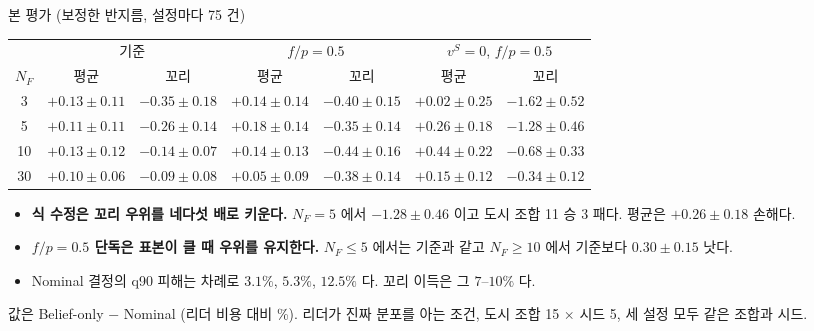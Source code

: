 \documentclass[aspectratio=169,11pt]{beamer}
\begin{document}
\begin{frame}{본 평가 (보정한 반지름, 설정마다 75 건)}
\begin{center}
\footnotesize
\begin{tabular}{ccccccc}
\toprule
 & \multicolumn{2}{c}{기준} & \multicolumn{2}{c}{$f/p = 0.5$} & \multicolumn{2}{c}{$v^{S} = 0$, $f/p = 0.5$}\\
\cmidrule(lr){2-3}\cmidrule(lr){4-5}\cmidrule(lr){6-7}
$N_F$ & 평균 & 꼬리 & 평균 & 꼬리 & 평균 & 꼬리\\
\midrule
3 & $+0.13 \pm 0.11$ & $-0.35 \pm 0.18$ & $+0.14 \pm 0.14$ & $-0.40 \pm 0.15$ & $+0.02 \pm 0.25$ & $-1.62 \pm 0.52$\\
5 & $+0.11 \pm 0.11$ & $-0.26 \pm 0.14$ & $+0.18 \pm 0.14$ & $-0.35 \pm 0.14$ & $+0.26 \pm 0.18$ & $-1.28 \pm 0.46$\\
10 & $+0.13 \pm 0.12$ & $-0.14 \pm 0.07$ & $+0.14 \pm 0.13$ & $-0.44 \pm 0.16$ & $+0.44 \pm 0.22$ & $-0.68 \pm 0.33$\\
30 & $+0.10 \pm 0.06$ & $-0.09 \pm 0.08$ & $+0.05 \pm 0.09$ & $-0.38 \pm 0.14$ & $+0.15 \pm 0.12$ & $-0.34 \pm 0.12$\\
\bottomrule
\end{tabular}
\end{center}
\begin{itemize}
  \item \textbf{식 수정은 꼬리 우위를 네다섯 배로 키운다.} $N_F = 5$ 에서 $-1.28 \pm 0.46$ 이고 도시 조합 11 승 3 패다. 평균은 $+0.26 \pm 0.18$ 손해다.
  \item \textbf{$f/p = 0.5$ 단독은 표본이 클 때 우위를 유지한다.} $N_F \le 5$ 에서는 기준과 같고 $N_F \ge 10$ 에서 기준보다 $0.30 \pm 0.15$ 낫다.
  \item Nominal 결정의 q90 피해는 차례로 $3.1\%$, $5.3\%$, $12.5\%$ 다. 꼬리 이득은 그 $7$--$10\%$ 다.
\end{itemize}
{\footnotesize 값은 Belief-only $-$ Nominal (리더 비용 대비 \%). 리더가 진짜 분포를 아는 조건, 도시 조합 15 $\times$ 시드 5, 세 설정 모두 같은 조합과 시드.}
\end{frame}
\end{document}
